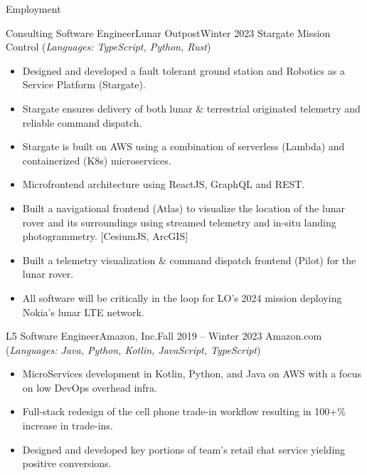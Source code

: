 \documentclass[]{mussocv}
\begin{document}
	\makeheader
	
	\begin{cvsection}{Employment}
		\begin{cvsubsection}{Consulting Software Engineer}{Lunar Outpost}{Winter 2023}
			Stargate Mission Control (\textit{Languages: TypeScript, Python, Rust})			
			\begin{itemize}
				\item Designed and developed a fault tolerant ground station and Robotics as a Service Platform (Stargate).
				\item Stargate ensures delivery of both lunar \& terrestrial originated telemetry and reliable command dispatch.
				\item Stargate is built on AWS using a combination of serverless (Lambda) and containerized (K8s) microservices.
				\item Microfrontend architecture using ReactJS, GraphQL and REST.
				\item Built a navigational frontend (Atlas) to visualize the location of the lunar rover and its surroundings using streamed telemetry and in-situ landing photogrammetry. [CesiumJS, ArcGIS]
				\item Built a telemetry visualization \& command dispatch frontend (Pilot) for the lunar rover.
				\item All software will be critically in the loop for LO's 2024 mission deploying Nokia's lunar LTE network.
			\end{itemize}
		\end{cvsubsection}
		
		\begin{cvsubsection}{L5 Software Engineer}{Amazon, Inc.}{Fall 2019 -- Winter 2023}
			Amazon.com (\textit{Languages: Java, Python, Kotlin, JavaScript, TypeScript})
			\begin{itemize}
				\item MicroServices development in Kotlin, Python, and Java on AWS with a focus on low DevOps overhead infra.
				\item Full-stack redesign of the cell phone trade-in workflow resulting in 100+\% increase in trade-ins.
				\item Designed and developed key portions of team's retail chat service yielding positive conversions.
			\end{itemize}
		\end{cvsubsection}
		

\end{cvsection}
\end{document}

